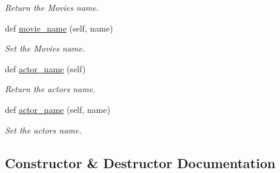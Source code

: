 \begin{DoxyCompactItemize}
\begin{DoxyCompactList}\small\item\em Return the Movie\textquotesingle{}s name. \end{DoxyCompactList}\item 
def \hyperlink{classbridges_1_1data__src__dependent_1_1movie__actor__wiki__data_1_1_movie_actor_wiki_data_aea5e460c9e8f74f56b0a70c4ef3f834a}{movie\+\_\+name} (self, name)
\begin{DoxyCompactList}\small\item\em Set the Movie\textquotesingle{}s name. \end{DoxyCompactList}\item 
def \hyperlink{classbridges_1_1data__src__dependent_1_1movie__actor__wiki__data_1_1_movie_actor_wiki_data_a7fcdb04a061044e590601c2298cf8b5d}{actor\+\_\+name} (self)
\begin{DoxyCompactList}\small\item\em Return the actor\textquotesingle{}s name. \end{DoxyCompactList}\item 
def \hyperlink{classbridges_1_1data__src__dependent_1_1movie__actor__wiki__data_1_1_movie_actor_wiki_data_a00c9cd99fb43f7bdc32e28b1ad9a91db}{actor\+\_\+name} (self, name)
\begin{DoxyCompactList}\small\item\em Set the actor\textquotesingle{}s name. \end{DoxyCompactList}\end{DoxyCompactItemize}


\subsection{Constructor \& Destructor Documentation}
\mbox{\label{classbridges_1_1data__src__dependent_1_1movie__actor__wiki__data_1_1_movie_actor_wiki_data_a9f1d5ab83dd834e7cebfeb195b0c2c80}} 
